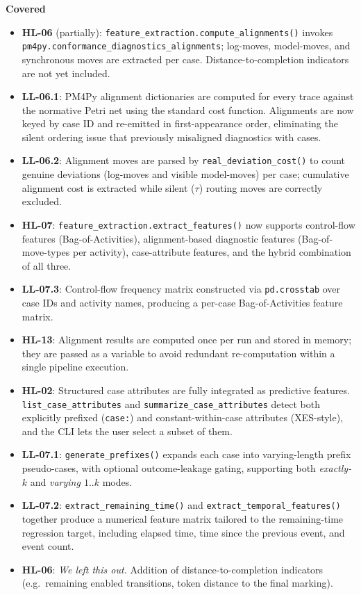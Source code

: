\documentclass[12pt,a4paper]{article}
\newcommand{\newcov}[1]{\colorbox{green!40}{\textbf{#1}}}
\begin{document}
\textbf{Covered}
\begin{itemize}
    \item \textbf{HL-06} (partially): \texttt{feature\_extraction.compute\_alignments()} invokes \texttt{pm4py.conformance\_diagnostics\_alignments}; log-moves, model-moves, and synchronous moves are extracted per case. Distance-to-completion indicators are not yet included.
    \item \textbf{LL-06.1}: PM4Py alignment dictionaries are computed for every trace against the normative Petri net using the standard cost function. Alignments are now keyed by case ID and re-emitted in first-appearance order, eliminating the silent ordering issue that previously misaligned diagnostics with cases.
    \item \textbf{LL-06.2}: Alignment moves are parsed by \texttt{real\_deviation\_cost()} to count genuine deviations (log-moves and visible model-moves) per case; cumulative alignment cost is extracted while silent ($\tau$) routing moves are correctly excluded.
    \item \textbf{HL-07}: \texttt{feature\_extraction.extract\_features()} now supports control-flow features (Bag-of-Activities), alignment-based diagnostic features (Bag-of-move-types per activity), case-attribute features, and the hybrid combination of all three.
    \item \textbf{LL-07.3}: Control-flow frequency matrix constructed via \texttt{pd.crosstab} over case IDs and activity names, producing a per-case Bag-of-Activities feature matrix.
    \item \textbf{HL-13}: Alignment results are computed once per run and stored in memory; they are passed as a variable to avoid redundant re-computation within a single pipeline execution.
    \item \newcov{HL-02}: Structured case attributes are fully integrated as predictive features. \texttt{list\_case\_attributes} and \texttt{summarize\_case\_attributes} detect both explicitly prefixed (\texttt{case:}) and constant-within-case attributes (XES-style), and the CLI lets the user select a subset of them.
    \item \newcov{LL-07.1}: \texttt{generate\_prefixes()} expands each case into varying-length prefix pseudo-cases, with optional outcome-leakage gating, supporting both \textit{exactly-$k$} and \textit{varying $1..k$} modes.
    \item \newcov{LL-07.2}: \texttt{extract\_remaining\_time()} and \texttt{extract\_temporal\_features()} together produce a numerical feature matrix tailored to the remaining-time regression target, including elapsed time, time since the previous event, and event count.
    \item \textbf{HL-06}:   \textit{We left this out.} Addition of distance-to-completion indicators (e.g.\ remaining enabled transitions, token distance to the final marking).
\end{itemize}
\end{document}
